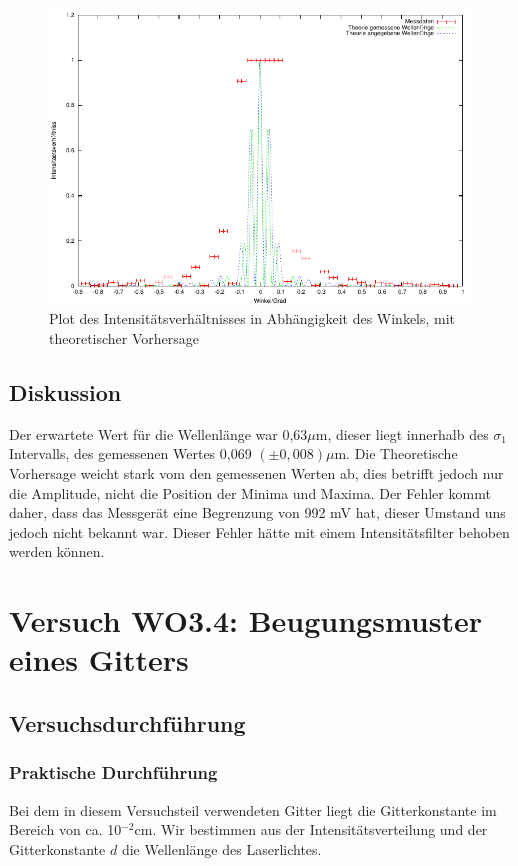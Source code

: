 \documentclass[12pt]{scrartcl}
\begin{document}
\begin{figure}[H]
\centering
    \includegraphics[scale = 1]{a_3.pdf}
  	\caption[Plot des Intensitätsverhältnisses in Abhängigkeit des Winkels, mit theoretischer Vorhersage]{Plot des Intensitätsverhältnisses in Abhängigkeit des Winkels, mit theoretischer Vorhersage}
  \label{fig:a_1}
\end{figure}


\subsection{Diskussion}
Der erwartete Wert für die Wellenlänge war 0,63$\mu$m, dieser liegt innerhalb des $\sigma_1$ Intervalls, des gemessenen Wertes 0,069 $(\pm 0,008) \mu$m. Die Theoretische Vorhersage weicht stark vom den gemessenen Werten ab, dies betrifft jedoch nur die Amplitude, nicht die Position der Minima und Maxima. Der Fehler kommt daher, dass das Messgerät eine Begrenzung von 992 mV hat, dieser Umstand uns jedoch nicht bekannt war. Dieser Fehler hätte mit einem Intensitätsfilter behoben werden können.

\section{Versuch WO3.4: Beugungsmuster eines Gitters}
\subsection{Versuchsdurchführung}

\subsubsection{Praktische Durchführung}
Bei dem in diesem Versuchsteil verwendeten Gitter liegt die Gitterkonstante im Bereich von ca. 10$^{-2}$cm. Wir bestimmen aus der Intensitätsverteilung und der Gitterkonstante $d$ die Wellenlänge des Laserlichtes.
\end{document}
